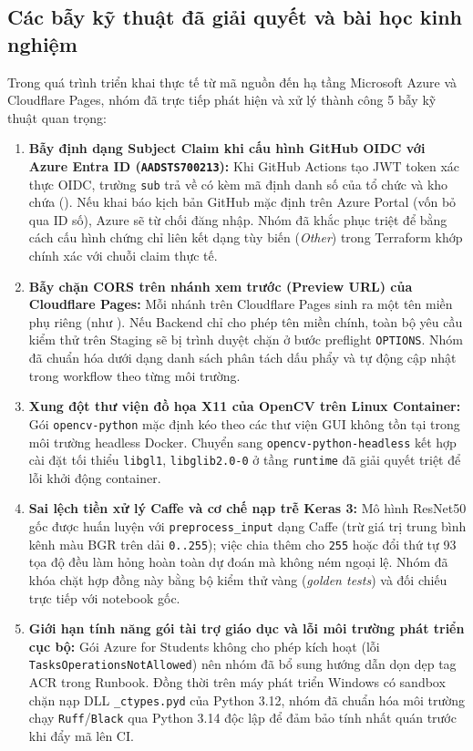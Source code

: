 \subsection{Các bẫy kỹ thuật đã giải quyết và bài học kinh nghiệm}
\label{subsec:bay_ky_thuat}

Trong quá trình triển khai thực tế từ mã nguồn đến hạ tầng Microsoft Azure và Cloudflare Pages, nhóm đã trực tiếp phát hiện và xử lý thành công 5 bẫy kỹ thuật quan trọng:
\begin{enumerate}
    \item \textbf{Bẫy định dạng Subject Claim khi cấu hình GitHub OIDC với Azure Entra ID (\texttt{AADSTS700213}):} Khi GitHub Actions tạo JWT token xác thực OIDC, trường \texttt{sub} trả về có kèm mã định danh số của tổ chức và kho chứa (). Nếu khai báo kịch bản GitHub mặc định trên Azure Portal (vốn bỏ qua ID số), Azure sẽ từ chối đăng nhập. Nhóm đã khắc phục triệt để bằng cách cấu hình chứng chỉ liên kết dạng tùy biến (\textit{Other}) trong Terraform khớp chính xác với chuỗi claim thực tế.
    \item \textbf{Bẫy chặn CORS trên nhánh xem trước (Preview URL) của Cloudflare Pages:} Mỗi nhánh trên Cloudflare Pages sinh ra một tên miền phụ riêng (như ). Nếu Backend chỉ cho phép tên miền chính, toàn bộ yêu cầu kiểm thử trên Staging sẽ bị trình duyệt chặn ở bước preflight \texttt{OPTIONS}. Nhóm đã chuẩn hóa  dưới dạng danh sách phân tách dấu phẩy và tự động cập nhật trong workflow  theo từng môi trường.
    \item \textbf{Xung đột thư viện đồ họa X11 của OpenCV trên Linux Container:} Gói \texttt{opencv-python} mặc định kéo theo các thư viện GUI không tồn tại trong môi trường headless Docker. Chuyển sang \texttt{opencv-python-headless} kết hợp cài đặt tối thiểu \texttt{libgl1}, \texttt{libglib2.0-0} ở tầng \texttt{runtime} đã giải quyết triệt để lỗi khởi động container.
    \item \textbf{Sai lệch tiền xử lý Caffe và cơ chế nạp trễ Keras 3:} Mô hình ResNet50 gốc được huấn luyện với \texttt{preprocess\_input} dạng Caffe (trừ giá trị trung bình kênh màu BGR trên dải \texttt{0..255}); việc chia thêm cho \texttt{255} hoặc đổi thứ tự 93 tọa độ đều làm hỏng hoàn toàn dự đoán mà không ném ngoại lệ. Nhóm đã khóa chặt hợp đồng này bằng bộ kiểm thử vàng (\textit{golden tests}) và đối chiếu trực tiếp với notebook gốc.
    \item \textbf{Giới hạn tính năng gói tài trợ giáo dục và lỗi môi trường phát triển cục bộ:} Gói Azure for Students không cho phép kích hoạt  (lỗi \texttt{TasksOperationsNotAllowed}) nên nhóm đã bổ sung hướng dẫn dọn dẹp tag ACR trong Runbook. Đồng thời trên máy phát triển Windows có sandbox chặn nạp DLL \texttt{\_ctypes.pyd} của Python 3.12, nhóm đã chuẩn hóa môi trường chạy \texttt{Ruff}/\texttt{Black} qua Python 3.14 độc lập để đảm bảo tính nhất quán trước khi đẩy mã lên CI.
\end{enumerate}
